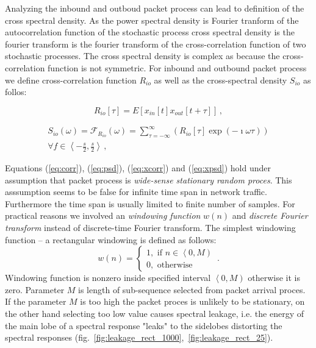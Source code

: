 Analyzing the inbound and outboud packet process can lead to definition of the cross spectral
density\cite{penny2000signal}.
As the power spectral density is Fourier tranform of the autocorrelation function of the 
stochastic process cross spectral density is the fourier transform is the fourier transform
of the cross-correlation function of two stochastic processes. The cross spectral density is
complex as because the cross-correlation function is not symmetric. 
For inbound and outbound packet process we define cross-correlation function $R_{io}$ 
as well as the cross-spectral density $S_{io}$ as follos:

\begin{equation}\label{eq:xcorr}
R_{io}\left[\tau\right] = E[x_{in}\left[t\right]x_{out}\left[t+\tau\right]]\, , 
\end{equation}

\begin{equation}\label{eq:xpsd}
\begin{split}
S_{io}(\omega) = \mathcal{F}_{R_{io}}\left(\omega\right) = \sum_{\tau=-\infty}^{\infty} 
\left( R_{io}\left[\tau\right] \exp\left( -\imath \omega\tau \right)\right) \\ 
\forall f \in \left\langle -\frac{s}{2},\frac{s}{2} \right\rangle\, , 
\end{split}
\end{equation}

Equations (\ref{eq:corr}), (\ref{eq:psd}), (\ref{eq:xcorr}) and (\ref{eq:xpsd}) 
hold under assumption that packet process is \emph{wide-sense stationary random proces}.
This asssumption seems to be false for infinite time span in network traffic.
Furthermore the time span is usually limited to finite number of samples.
For practical reasons we involved an \emph{windowing function} $w(n)$ and 
\emph{discrete Fourier transform} instead of discrete-time Fourier transform. 
The simplest windowing function -- a rectangular windowing is defined as follows:
\begin{equation}
w(n) = \left\lbrace \begin{array}{l} 
1, \mbox{ if } n\in \left\langle 0, M \right) \\ 
0, \mbox{ otherwise} \end{array}\right. \,.
\end{equation}
Windowing function is nonzero inside specified interval $\left\langle 0, M \right)$ 
otherwise it is zero. 
Parameter  $M$ is length of sub-sequence selected from packet arrival proces. 
If the parameter $M$ is too high the packet proces is unlikely to be stationary, 
on the other hand selecting too low value causes spectral leakage, i.e. the energy 
of the main lobe of a spectral response "leaks" to the sidelobes distorting the 
spectral responses \cite{kay1981spectrum} 
(fig.~\ref{fig:leakage_rect_1000},~\ref{fig:leakage_rect_25}). 

